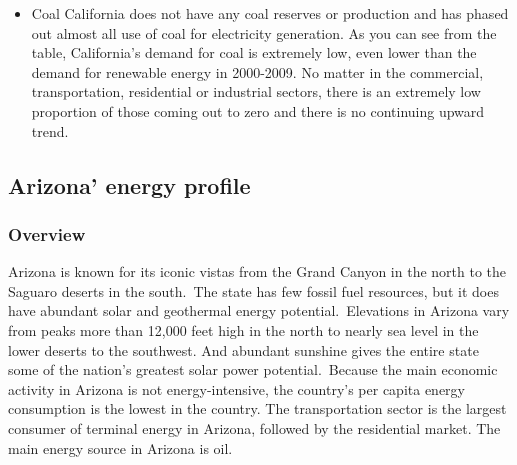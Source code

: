 \documentclass{mcmthesis}
\begin{document}
\begin{itemize}
  \item Coal
  California does not have any coal reserves or production and has phased out almost all use of coal for electricity generation. As you can see from the table, California's demand for coal is extremely low, even lower than the demand for renewable energy in 2000-2009. No matter in the commercial, transportation, residential or industrial sectors, there is an extremely low proportion of those coming out to zero and there is no continuing upward trend.
\end{itemize}
\subsection{Arizona' energy profile}
\subsubsection{Overview}
Arizona is known for its iconic vistas from the Grand Canyon in the north to the Saguaro deserts in the south. The state has few fossil fuel resources, but it does have abundant solar and geothermal energy potential. Elevations in Arizona vary from peaks more than 12,000 feet high in the north to nearly sea level in the lower deserts to the southwest. And abundant sunshine gives the entire state some of the nation’s greatest solar power potential. Because the main economic activity in Arizona is not energy-intensive, the country's per capita energy consumption is the lowest in the country. The transportation sector is the largest consumer of terminal energy in Arizona, followed by the residential market. The main energy source in Arizona is oil.
\end{document}
